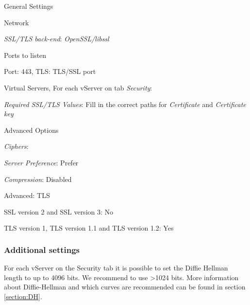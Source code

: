 \begin{itemize*}
    \item General Settings
    \begin{itemize*}
        \item Network
        \begin{itemize*}
            \item \emph{SSL/TLS back-end}: \emph{OpenSSL/libssl}
        \end{itemize*}
        \item Ports to listen
        \begin{itemize*}
            \item Port: 443, TLS: TLS/SSL port
        \end{itemize*}
    \end{itemize*}
    \item Virtual Servers, For each vServer on tab \emph{Security}:
    \begin{itemize*}
        \item \emph{Required SSL/TLS Values}: Fill in the correct paths for \emph{Certificate} and \emph{Certificate key}
        \item Advanced Options
        \begin{itemize*}
            \item \emph{Ciphers}: \ttbox{\cipherStringB}
            \item \emph{Server Preference}: Prefer
            \item \emph{Compression}: Disabled
        \end{itemize*}
    \end{itemize*}
    \item Advanced: TLS
    \begin{itemize*}
        \item SSL version 2 and SSL version 3: No
        \item TLS version 1, TLS version 1.1 and TLS version 1.2: Yes
    \end{itemize*}
\end{itemize*}

\subsubsection{Additional settings}
For each vServer on the Security tab it is possible to set the Diffie Hellman length to up to 4096 bits. We recommend to use \textgreater 1024 bits.
More information about Diffie-Hellman and which curves are recommended can be found in section \ref{section:DH}.

